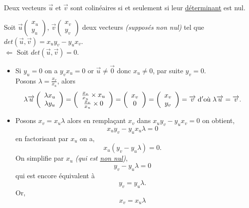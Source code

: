 \documentclass[french]{book}
\begin{document}
\begin{thm}
Deux vecteurs $\overrightarrow{u}$ et $\overrightarrow{v}$ sont colinéaires si et seulement si leur \underline{déterminant} est nul.
\end{thm}

\begin{demo}
Soit $\overrightarrow{u} \left( \begin{array}{c}
x_u \\
y_u 
\end{array} \right)$,
$\overrightarrow{v} \left( \begin{array}{c}
x_v \\
y_v 
\end{array} \right)$ deux vecteurs \emph{(supposés non nul)} tel que $det(\overrightarrow{u}, \overrightarrow{v})=x_u y_v - y_u x_v$.\\

$\Longleftarrow$ Soit $det(\overrightarrow{u}, \overrightarrow{v})=0$.
\begin{itemize}
\item Si $y_u=0$ on a $y_v x_u =0$ or $\overrightarrow{u} \neq \overrightarrow{0}$ donc $x_u \neq 0$, par suite $y_v=0$. \\
Posons $\lambda=\frac{x_v}{x_u}$, alors $$\lambda \overrightarrow{u}\left( \begin{array}{c}
\lambda x_u \\
\lambda y_u 
\end{array} \right) = \left( \begin{array}{c}
\frac{x_v}{x_u} \times x_u \\
\frac{x_v}{x_u} \times  0
\end{array} \right) = \left( \begin{array}{c}
x_v \\
0
\end{array} \right) = \left( \begin{array}{c}
x_v \\
y_v
\end{array} \right) = \overrightarrow{v} \; \rm{ d'o\grave{u}} \; \lambda \overrightarrow{u} =\overrightarrow{v}  .$$

\item Posons $x_v= x_u \lambda$ alors en remplaçant $x_v$ dans $x_u y_v - y_u x_v =0 $ on obtient, 
$$ x_u y_v - y_u x_u \lambda = 0 $$
en factorisant par $x_u$ on a, 
$$x_u ( y_v -y_u \lambda) =0.$$
On simplifie par $x_u$ \emph{(qui est \underline{non nul})},
$$y_v-y_u\lambda=0$$
qui est encore équivalent à
$$y_v=y_u \lambda.$$
Or,  $$x_v= x_u \lambda$$


\end{itemize}
\end{demo}
\end{document}
